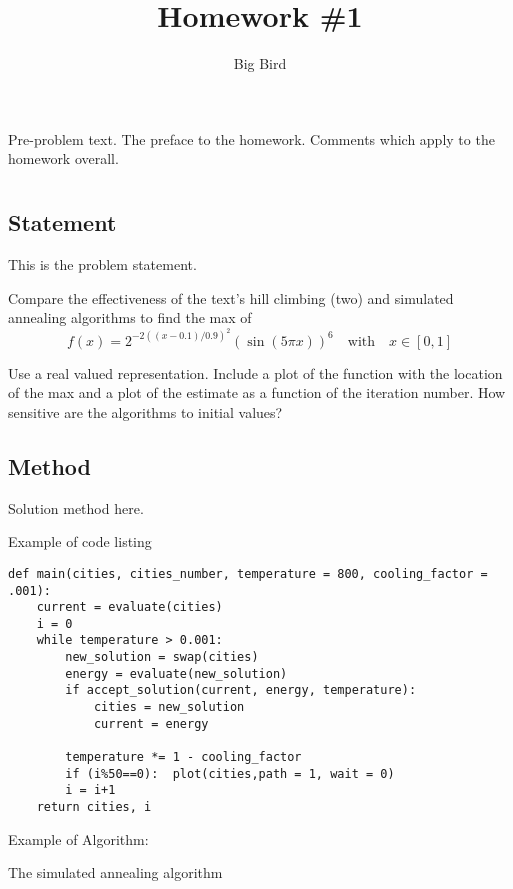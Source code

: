 \documentclass[12pt]{article}
\title{Homework \#1}
\author{Big Bird}
\begin{document}
\maketitle

Pre-problem text.  The preface to the homework.  Comments which apply to the homework overall.

\section{} %

\subsection{Statement}
This is the problem statement.

Compare the effectiveness of the text's hill climbing (two) and simulated annealing algorithms to
find the max of
\[ f(x)=2^{-2((x-0.1)/0.9)^2}(\sin(5\pi x))^6 \quad
\mbox{with} \quad x\in [0,1]\]

Use a real valued representation.  Include a plot of the function with the location of the max and
a plot of the estimate as a function of the iteration number.	How sensitive are the algorithms to
initial values?
\subsection{Method}
Solution method here.

Example of code listing
\begin{verbatim}
def main(cities, cities_number, temperature = 800, cooling_factor = .001):
    current = evaluate(cities)
    i = 0
    while temperature > 0.001:
        new_solution = swap(cities)
        energy = evaluate(new_solution)
        if accept_solution(current, energy, temperature):
            cities = new_solution
            current = energy

        temperature *= 1 - cooling_factor
        if (i%50==0):  plot(cities,path = 1, wait = 0)
        i = i+1
    return cities, i
\end{verbatim}

Example of Algorithm:

\begin{algorithm}[H]
    \begin{algorithmic}
        \EndIf{}
        \EndWhile{}
    \end{algorithmic}
    \caption{The simulated annealing algorithm}\label{alg:simulated-annealing}
\end{algorithm}
\end{document}

